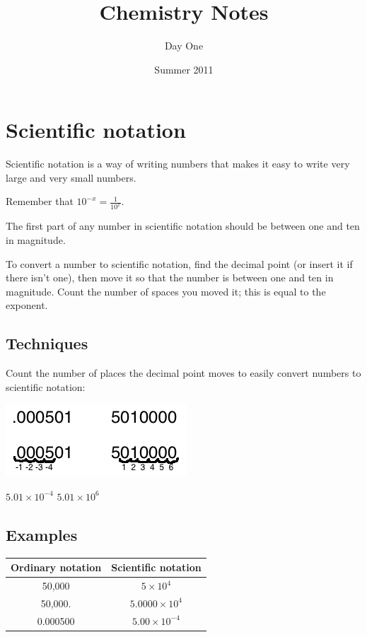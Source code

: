 \documentclass[]{article}
\title{Chemistry Notes}
\author{Day One}
\date{Summer 2011}
\begin{document}
\maketitle

\section{Scientific notation}

Scientific notation is a way of writing numbers that makes it easy to write very large and very small numbers.

Remember that $10^{-x} = \frac{1}{10^{x}}$.

The first part of any number in scientific notation should be between one and ten in magnitude.

To convert a number to scientific notation, find the decimal point (or insert it if there isn't one), then move it so that the number is between one and ten in magnitude. Count the number of spaces you moved it; this is equal to the exponent.

\subsection{Techniques}
Count the number of places the decimal point moves to easily convert numbers to scientific notation:

\includegraphics{scientific_notation.png}

\hspace{.5cm} $5.01 \times 10^{-4}$ \hspace{4cm} $5.01 \times 10^6$

\subsection{Examples}
\begin{tabular}{ | c | c | }
    \hline
    Ordinary notation & Scientific notation \\ \hline
    50,000 & $5 \times 10^4$ \\ \hline
    50,000. & $5.0000 \times 10^4$ \\ \hline
    0.000500 & $5.00 \times 10^{-4}$ \\ \hline
\end{tabular}
\vspace{.5cm}
\end{document}
